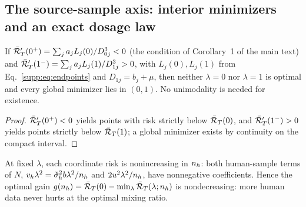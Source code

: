 \subsection{The source-sample axis: interior minimizers and an exact dosage law}

\begin{corollary}\label{supp:cor:interior}
If $\bar{\mathcal{R}}_T'(0^+) = \sum_j a_j L_j(0)/D_{0j}^3 < 0$ (the condition of Corollary~1 of the main text) and $\bar{\mathcal{R}}_T'(1^-) = \sum_j a_j L_j(1)/D_{1j}^3 > 0$, with $L_j(0), L_j(1)$ from Eq.~\eqref{supp:eq:endpoints} and $D_{1j} = b_j + \mu$, then neither $\lambda = 0$ nor $\lambda = 1$ is optimal and every global minimizer lies in $(0,1)$.
No unimodality is needed for existence.
\end{corollary}

\begin{proof}
$\bar{\mathcal{R}}_T'(0^+) < 0$ yields points with risk strictly below $\bar{\mathcal{R}}_T(0)$, and $\bar{\mathcal{R}}_T'(1^-) > 0$ yields points strictly below $\bar{\mathcal{R}}_T(1)$; a global minimizer exists by continuity on the compact interval.
\end{proof}

\begin{lemma}\label{supp:lem:monoval}
At fixed $\lambda$, each coordinate risk is nonincreasing in $n_h$: both human-sample terms of $N$, $v_h\lambda^2 = \tilde\sigma_h^2 b \lambda^2/n_h$ and $2u^2\lambda^2/n_h$, have nonnegative coefficients.
Hence the optimal gain $g(n_h) = \bar{\mathcal{R}}_T(0) - \min_{\lambda}\bar{\mathcal{R}}_T(\lambda; n_h)$ is nondecreasing: more human data never hurts at the optimal mixing ratio.
\end{lemma}

